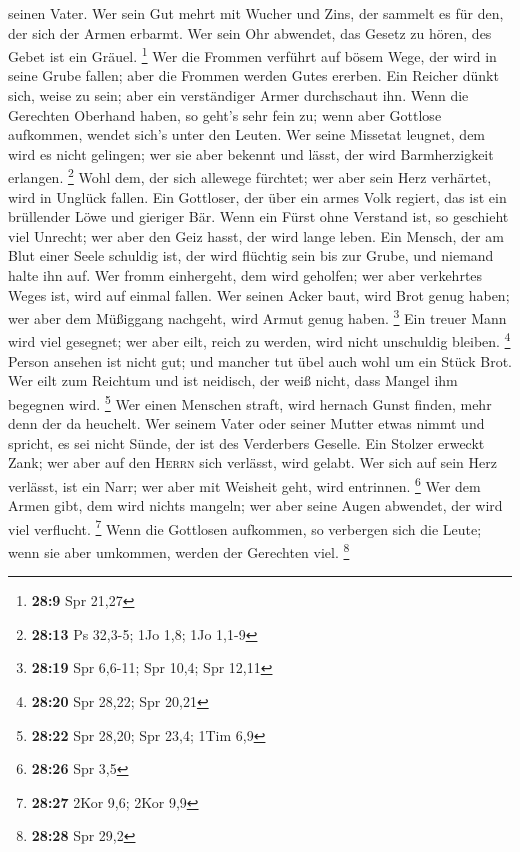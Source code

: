 seinen Vater.  Wer sein Gut mehrt mit Wucher und Zins, der
sammelt es für den, der sich der Armen erbarmt.  Wer sein
Ohr abwendet, das Gesetz zu hören, des Gebet ist ein Gräuel. \footnote{\textbf{28:9}
  Spr 21,27}  Wer die Frommen verführt auf bösem Wege,
der wird in seine Grube fallen; aber die Frommen werden Gutes ererben.
 Ein Reicher dünkt sich, weise zu sein; aber ein
verständiger Armer durchschaut ihn.  Wenn die Gerechten
Oberhand haben, so geht's sehr fein zu; wenn aber Gottlose aufkommen,
wendet sich's unter den Leuten.  Wer seine Missetat
leugnet, dem wird es nicht gelingen; wer sie aber bekennt und lässt, der
wird Barmherzigkeit erlangen. \footnote{\textbf{28:13} Ps 32,3-5; 1Jo
  1,8; 1Jo 1,1-9}  Wohl dem, der sich allewege fürchtet;
wer aber sein Herz verhärtet, wird in Unglück fallen. 
Ein Gottloser, der über ein armes Volk regiert, das ist ein brüllender
Löwe und gieriger Bär.  Wenn ein Fürst ohne Verstand ist,
so geschieht viel Unrecht; wer aber den Geiz hasst, der wird lange
leben.  Ein Mensch, der am Blut einer Seele schuldig ist,
der wird flüchtig sein bis zur Grube, und niemand halte ihn auf.
 Wer fromm einhergeht, dem wird geholfen; wer aber
verkehrtes Weges ist, wird auf einmal fallen.  Wer seinen
Acker baut, wird Brot genug haben; wer aber dem Müßiggang nachgeht, wird
Armut genug haben. \footnote{\textbf{28:19} Spr 6,6-11; Spr 10,4; Spr
  12,11}  Ein treuer Mann wird viel gesegnet; wer aber
eilt, reich zu werden, wird nicht unschuldig bleiben. \footnote{\textbf{28:20}
  Spr 28,22; Spr 20,21}  Person ansehen ist nicht gut;
und mancher tut übel auch wohl um ein Stück Brot.  Wer
eilt zum Reichtum und ist neidisch, der weiß nicht, dass Mangel ihm
begegnen wird. \footnote{\textbf{28:22} Spr 28,20; Spr 23,4; 1Tim 6,9}
 Wer einen Menschen straft, wird hernach Gunst finden,
mehr denn der da heuchelt.  Wer seinem Vater oder seiner
Mutter etwas nimmt und spricht, es sei nicht Sünde, der ist des
Verderbers Geselle.  Ein Stolzer erweckt Zank; wer aber
auf den \textsc{Herrn} sich verlässt, wird gelabt.  Wer
sich auf sein Herz verlässt, ist ein Narr; wer aber mit Weisheit geht,
wird entrinnen. \footnote{\textbf{28:26} Spr 3,5}  Wer
dem Armen gibt, dem wird nichts mangeln; wer aber seine Augen abwendet,
der wird viel verflucht. \footnote{\textbf{28:27} 2Kor 9,6; 2Kor 9,9}
 Wenn die Gottlosen aufkommen, so verbergen sich die
Leute; wenn sie aber umkommen, werden der Gerechten viel. \footnote{\textbf{28:28}
  Spr 29,2}

